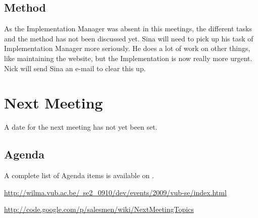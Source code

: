 \documentclass[a4paper, 12pt]{article}
\begin{document}
		\subsection{Method}
As the Implementation Manager was absent in this meetings, the different tasks and the method has not been discussed yet.	Sina will need to pick up his task of Implementation Manager more seriously. He does a lot of work on other things, like maintaining the website, but the Implementation is now really more urgent. Nick will send Sina an e-mail to clear this up.
	\section{Next Meeting}
		A date for the next meeting has not yet been set.
%
%	
		\subsection{Agenda}
A complete list of Agenda items is available on \cite{agendaitems}.\\
	
	\begin{thebibliography}{99}
		\href{http://wilma.vub.ac.be/~se2\_{}0910/dev/events/2009/vub-se/index.html}{http://wilma.vub.ac.be/~se2\_{}0910/dev/events/2009/vub-se/index.html}
		
		
		\href{http://code.google.com/p/salesmen/wiki/NextMeetingTopics}{http://code.google.com/p/salesmen/wiki/NextMeetingTopics}

		
	\end{thebibliography}	
		
\end{document}
